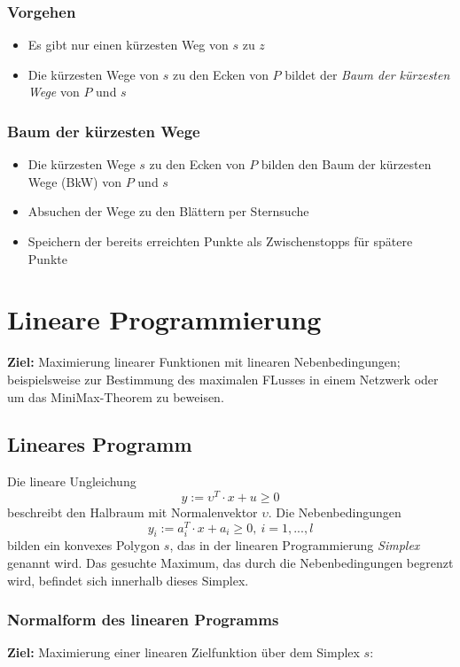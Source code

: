 \subsubsection{Vorgehen}
\begin{itemize}
	\item Es gibt nur einen kürzesten Weg von \(s\) zu \(z\)
	\item Die kürzesten Wege von \(s\) zu den Ecken von \(P\) bildet der \textit{Baum der kürzesten Wege} von \(P\) und \(s\)
\end{itemize}

\subsubsection{Baum der kürzesten Wege}
\begin{itemize}
	\item Die kürzesten Wege \(s\) zu den Ecken von \(P\) bilden den Baum der kürzesten Wege (BkW) von \(P\) und \(s\)
	\item Absuchen der Wege zu den Blättern per Sternsuche
	\item Speichern der bereits erreichten Punkte als Zwischenstopps für spätere Punkte
\end{itemize}



\section{Lineare Programmierung}
\textbf{Ziel:} Maximierung linearer Funktionen mit linearen Nebenbedingungen; beispielsweise zur Bestimmung des maximalen FLusses in einem Netzwerk oder um das MiniMax-Theorem zu beweisen.

\subsection{Lineares Programm}
Die lineare Ungleichung
\[y := \upsilon^T \cdot x + u \geq 0\]
beschreibt den Halbraum mit Normalenvektor \(\upsilon\). Die Nebenbedingungen
\[y_i := a_i^T \cdot x + a_i \geq 0,~i = 1,...,l\]
bilden ein konvexes Polygon \(s\), das in der linearen Programmierung \textit{Simplex} genannt wird. Das gesuchte Maximum, das durch die Nebenbedingungen begrenzt wird, befindet sich innerhalb dieses Simplex.

\subsubsection{Normalform des linearen Programms}
\textbf{Ziel:} Maximierung einer linearen Zielfunktion über dem Simplex \(s\):

